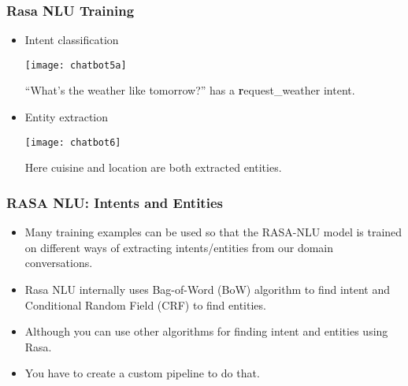  \begin{frame}[fragile]\frametitle{Rasa NLU Training}

\begin{itemize}
\item Intent classification
\begin{center}
\texttt{[image: chatbot5a]}
\end{center}
``What’s the weather like tomorrow?'' has a {\textbf request\_weather} intent.
\item Entity extraction
\begin{center}
\texttt{[image: chatbot6]}
\end{center}
Here cuisine and location are both extracted entities.
\end{itemize}

\end{frame}

 \begin{frame}[fragile]\frametitle{RASA NLU: Intents and Entities}
\begin{itemize}
\item Many training examples can be used so that the RASA-NLU model is trained on different ways of extracting intents/entities from our domain conversations.
\item Rasa NLU internally uses Bag-of-Word (BoW) algorithm to find intent and Conditional Random Field (CRF) to find entities. 
\item Although you can use other algorithms for finding intent and entities using Rasa. 
\item You have to create a custom pipeline to do that. 
\end{itemize}


\end{frame}


